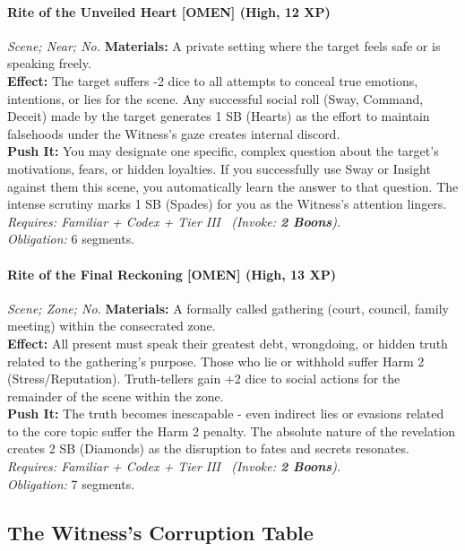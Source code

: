 \paragraph{Rite of the Unveiled Heart \textnormal{[OMEN]} (High, 12 XP)} \emph{Scene; Near; No.}
\textbf{Materials:} A private setting where the target feels safe or is speaking freely.\\
\textbf{Effect:} The target suffers -2 dice to all attempts to conceal true emotions, intentions, or lies for the scene. Any successful social roll (Sway, Command, Deceit) made by the target generates 1 SB (Hearts) as the effort to maintain falsehoods under the Witness's gaze creates internal discord.\\
\textbf{Push It:} You may designate one specific, complex question about the target's motivations, fears, or hidden loyalties. If you successfully use Sway or Insight against them this scene, you automatically learn the answer to that question. The intense scrutiny marks 1 SB (Spades) for you as the Witness's attention lingers.\\
\emph{Requires: Familiar + Codex + Tier III \ (\textit{Invoke:} \textbf{2 Boons}).}\\
\emph{Obligation:} 6 segments.

\paragraph{Rite of the Final Reckoning \textnormal{[OMEN]} (High, 13 XP)} \emph{Scene; Zone; No.}
\textbf{Materials:} A formally called gathering (court, council, family meeting) within the consecrated zone.\\
\textbf{Effect:} All present must speak their greatest debt, wrongdoing, or hidden truth related to the gathering's purpose. Those who lie or withhold suffer Harm 2 (Stress/Reputation). Truth-tellers gain +2 dice to social actions for the remainder of the scene within the zone.\\
\textbf{Push It:} The truth becomes inescapable - even indirect lies or evasions related to the core topic suffer the Harm 2 penalty. The absolute nature of the revelation creates 2 SB (Diamonds) as the disruption to fates and secrets resonates.\\
\emph{Requires: Familiar + Codex + Tier III \ (\textit{Invoke:} \textbf{2 Boons}).}\\
\emph{Obligation:} 7 segments.

\subsection*{The Witness's Corruption Table}
\label{sec:witness-corruption}

